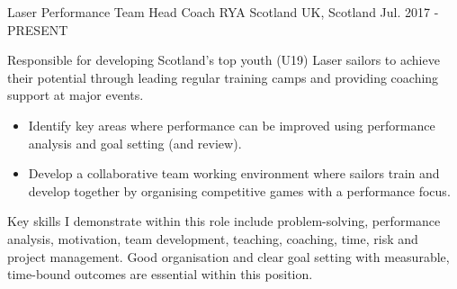 \begin{cventries}
  \cventry
    {Laser Performance Team Head Coach} %
    {RYA Scotland} %
    {UK, Scotland} %
    {Jul. 2017 - PRESENT} %
    {
      Responsible for developing Scotland’s top youth (U19) Laser sailors to achieve their potential through leading regular training camps and providing coaching support at major events. 
      \begin{itemize}
          \item Identify key areas where performance can be improved using performance analysis and goal setting (and review).
          \item Develop a collaborative team working environment where sailors train and develop together by organising competitive games with a performance focus.
      \end{itemize}
      Key skills I demonstrate within this role include problem-solving, performance analysis, motivation, team development, teaching, coaching, time, risk and project management. Good organisation and clear goal setting with measurable, time-bound outcomes are essential within this position.
     }


\end{cventries}
